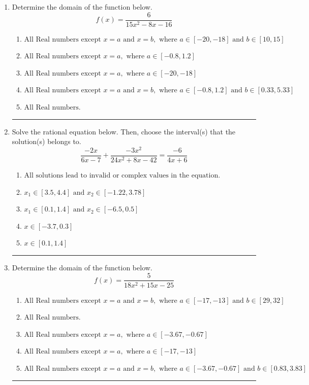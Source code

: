 \documentclass[14pt]{extbook}
\newcommand{\litem}[1]{\item#1\hspace*{-1cm}\rule{\textwidth}{0.4pt}}
\begin{document}
\begin{enumerate}
{\begin{enumerate}[label=\Alph*.]
\end{enumerate} }
\litem{
Determine the domain of the function below.\[ f(x) = \frac{6}{15x^{2} -8 x -16} \]\begin{enumerate}[label=\Alph*.]
\item \( \text{All Real numbers except } x = a \text{ and } x = b, \text{ where } a \in [-20, -18] \text{ and } b \in [10, 15] \)
\item \( \text{All Real numbers except } x = a, \text{ where } a \in [-0.8, 1.2] \)
\item \( \text{All Real numbers except } x = a, \text{ where } a \in [-20, -18] \)
\item \( \text{All Real numbers except } x = a \text{ and } x = b, \text{ where } a \in [-0.8, 1.2] \text{ and } b \in [0.33, 5.33] \)
\item \( \text{All Real numbers.} \)

\end{enumerate} }
\litem{
Solve the rational equation below. Then, choose the interval(s) that the solution(s) belongs to.\[ \frac{-2x}{6x -7} + \frac{-3x^{2}}{24x^{2} +8 x -42} = \frac{-6}{4x + 6} \]\begin{enumerate}[label=\Alph*.]
\item \( \text{All solutions lead to invalid or complex values in the equation.} \)
\item \( x_1 \in [3.5, 4.4] \text{ and } x_2 \in [-1.22,3.78] \)
\item \( x_1 \in [0.1, 1.4] \text{ and } x_2 \in [-6.5,0.5] \)
\item \( x \in [-3.7,0.3] \)
\item \( x \in [0.1,1.4] \)

\end{enumerate} }
\litem{
Determine the domain of the function below.\[ f(x) = \frac{5}{18x^{2} +15 x -25} \]\begin{enumerate}[label=\Alph*.]
\item \( \text{All Real numbers except } x = a \text{ and } x = b, \text{ where } a \in [-17, -13] \text{ and } b \in [29, 32] \)
\item \( \text{All Real numbers.} \)
\item \( \text{All Real numbers except } x = a, \text{ where } a \in [-3.67, -0.67] \)
\item \( \text{All Real numbers except } x = a, \text{ where } a \in [-17, -13] \)
\item \( \text{All Real numbers except } x = a \text{ and } x = b, \text{ where } a \in [-3.67, -0.67] \text{ and } b \in [0.83, 3.83] \)


\end{enumerate}}
\end{enumerate}
\end{document}
